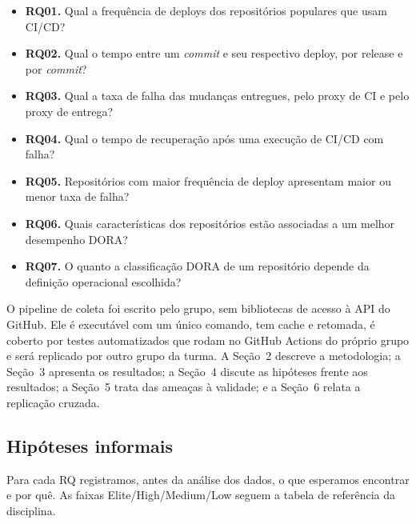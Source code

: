 \begin{itemize}
  \item \textbf{RQ01.} Qual a frequência de deploys dos repositórios populares que usam CI/CD?
  \item \textbf{RQ02.} Qual o tempo entre um \textit{commit} e seu respectivo deploy, por release e por \textit{commit}?
  \item \textbf{RQ03.} Qual a taxa de falha das mudanças entregues, pelo proxy de CI e pelo proxy de entrega?
  \item \textbf{RQ04.} Qual o tempo de recuperação após uma execução de CI/CD com falha?
  \item \textbf{RQ05.} Repositórios com maior frequência de deploy apresentam maior ou menor taxa de falha?
  \item \textbf{RQ06.} Quais características dos repositórios estão associadas a um melhor desempenho DORA?
  \item \textbf{RQ07.} O quanto a classificação DORA de um repositório depende da definição operacional escolhida?
\end{itemize}

O pipeline de coleta foi escrito pelo grupo, sem bibliotecas de acesso à API do
GitHub. Ele é executável com um único comando, tem cache e retomada, é coberto
por testes automatizados que rodam no GitHub Actions do próprio grupo e será
replicado por outro grupo da turma. A Seção~2 descreve a metodologia; a
Seção~3 apresenta os resultados; a Seção~4 discute as hipóteses frente aos
resultados; a Seção~5 trata das ameaças à validade; e a Seção~6 relata a
replicação cruzada.

\subsection{Hipóteses informais}
\label{sec:hipoteses}

Para cada RQ registramos, antes da análise dos dados, o que esperamos encontrar
e por quê. As faixas Elite/High/Medium/Low seguem a tabela de referência da
disciplina.

